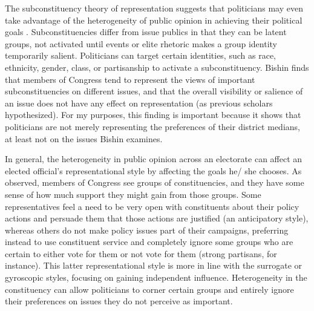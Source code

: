The subconstituency theory of representation suggests that politicians may even take advantage of the heterogeneity of public opinion in achieving their political goals \citep{Bishin2009}. Subconstituencies differ from issue publics in that they can be latent groups, not activated until events or elite rhetoric makes a group identity temporarily salient. Politicians can target certain identities, such as race, ethnicity, gender, class, or partisanship to activate a subconstituency. Bishin finds that members of Congress tend to represent the views of important subconstituencies on different issues, and that the overall visibility or salience of an issue does not have any effect on representation (as previous scholars hypothesized). For my purposes, this finding is important because it shows that politicians are not merely representing the preferences of their district medians, at least not on the issues Bishin examines.

In general, the heterogeneity in public opinion across an electorate can affect an elected official's representational style by affecting the goals he/ she chooses. As \citet{Fenno1977} observed, members of Congress see groups of constituencies, and they have some sense of how much support they might gain from those groups. Some representatives feel a need to be very open with constituents about their policy actions and persuade them that those actions are justified (an anticipatory style), whereas others do not make policy issues part of their campaigns, preferring instead to use constituent service and completely ignore some groups who are certain to either vote for them or not vote for them (strong partisans, for instance). This latter representational style is more in line with the surrogate or gyroscopic styles, focusing on gaining independent influence. Heterogeneity in the constituency can allow politicians to corner certain groups and entirely ignore their preferences on issues they do not perceive as important.

